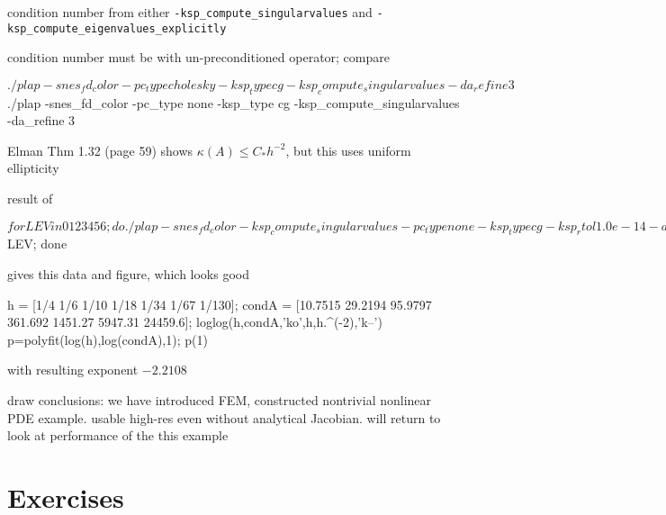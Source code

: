 condition number from either \texttt{-ksp\_compute\_singularvalues} and \texttt{-ksp\_compute\_eigenvalues\_explicitly}

condition number must be with un-preconditioned operator; compare
\begin{cline}
$ ./plap -snes_fd_color -pc_type cholesky -ksp_type cg -ksp_compute_singularvalues -da_refine 3
$ ./plap -snes_fd_color -pc_type none -ksp_type cg -ksp_compute_singularvalues -da_refine 3
\end{cline}

Elman Thm 1.32 (page 59) shows $\kappa(A) \le C_* h^{-2}$, but this uses uniform ellipticity

result of
\begin{cline}
$ for LEV in 0 1 2 3 4 5 6; do ./plap -snes_fd_color -ksp_compute_singularvalues -pc_type none -ksp_type cg -ksp_rtol 1.0e-14 -da_refine $LEV; done
\end{cline}
gives this data and figure, which looks good
\begin{code}
h = [1/4 1/6 1/10 1/18 1/34 1/67 1/130];
condA = [10.7515 29.2194 95.9797 361.692 1451.27 5947.31 24459.6];
loglog(h,condA,'ko',h,h.^(-2),'k--')
p=polyfit(log(h),log(condA),1);
p(1)
\end{code}
with resulting exponent $-2.2108$

draw conclusions: we have introduced FEM, constructed nontrivial nonlinear PDE example.  usable high-res even without analytical Jacobian.  will return to look at performance of the this example


\section{Exercises}

